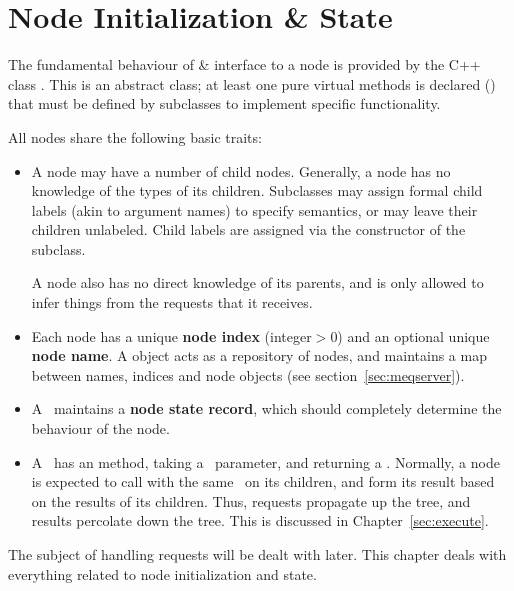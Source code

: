 \chapter{Node Initialization \& State}

  The fundamental behaviour of \& interface to a node is provided by the C++
  class . This is an abstract class; at least one pure virtual
  methods is declared () that must be defined by
  subclasses to implement specific functionality.

  All nodes share the following basic traits:

  \begin{itemize}

  \item A node may have a number of child nodes. Generally, a node has no
    knowledge of the types of its children. Subclasses may assign formal child
    labels (akin to argument names) to specify semantics, or may leave their
    children unlabeled. Child labels are assigned via the constructor of the
    subclass.
    
    A node also has no direct knowledge of its parents, and is only allowed to
    infer things from the requests that it receives.

  \item Each node has a unique {\bf node index} (integer$>$0) and an optional
    unique {\bf node name}. A  object acts as a repository of
    nodes, and maintains a map between names, indices and node objects (see
    section~\ref{sec:meqserver}).

  \item A \Node\ maintains a {\bf node state record}, which should completely
    determine the behaviour of the node. 
    
  \item A \Node\ has an  method, taking a \Request\ parameter,
    and returning a \Result. Normally, a node is expected to call
     with the same \Request\ on its children, and form its result
    based on the results of its children. Thus, requests propagate up the tree,
    and results percolate down the tree. This is discussed in
    Chapter~\ref{sec:execute}. 

  \end{itemize}
  
  The subject of handling requests will be dealt with later. This chapter deals
  with everything related to node initialization and state.
  
